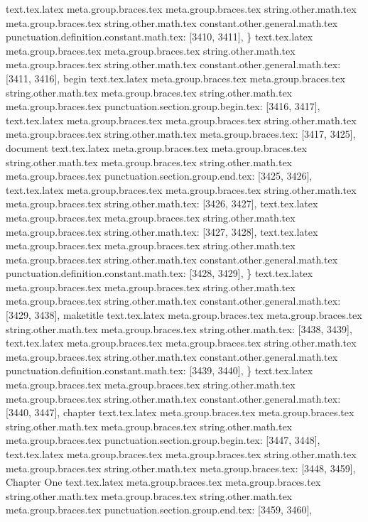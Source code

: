 {{{{{{{{{{{{{{{{{{{{{{{{{{{{{{{{{{{{{{{{{{{{{{{{{{{{{{{{{{{{{{{{{{{{{{{{{{{{{{{{{{{{{{{{{{{{{{{{{{{{{{}
text.tex.latex meta.group.braces.tex meta.group.braces.tex string.other.math.tex meta.group.braces.tex string.other.math.tex constant.other.general.math.tex punctuation.definition.constant.math.tex: [3410, 3411], {\}
text.tex.latex meta.group.braces.tex meta.group.braces.tex string.other.math.tex meta.group.braces.tex string.other.math.tex constant.other.general.math.tex: [3411, 3416], {begin}
text.tex.latex meta.group.braces.tex meta.group.braces.tex string.other.math.tex meta.group.braces.tex string.other.math.tex meta.group.braces.tex punctuation.section.group.begin.tex: [3416, 3417], {{}
text.tex.latex meta.group.braces.tex meta.group.braces.tex string.other.math.tex meta.group.braces.tex string.other.math.tex meta.group.braces.tex: [3417, 3425], {document}
text.tex.latex meta.group.braces.tex meta.group.braces.tex string.other.math.tex meta.group.braces.tex string.other.math.tex meta.group.braces.tex punctuation.section.group.end.tex: [3425, 3426], {}}
text.tex.latex meta.group.braces.tex meta.group.braces.tex string.other.math.tex meta.group.braces.tex string.other.math.tex: [3426, 3427], {
}
text.tex.latex meta.group.braces.tex meta.group.braces.tex string.other.math.tex meta.group.braces.tex string.other.math.tex: [3427, 3428], {
}
text.tex.latex meta.group.braces.tex meta.group.braces.tex string.other.math.tex meta.group.braces.tex string.other.math.tex constant.other.general.math.tex punctuation.definition.constant.math.tex: [3428, 3429], {\}
text.tex.latex meta.group.braces.tex meta.group.braces.tex string.other.math.tex meta.group.braces.tex string.other.math.tex constant.other.general.math.tex: [3429, 3438], {maketitle}
text.tex.latex meta.group.braces.tex meta.group.braces.tex string.other.math.tex meta.group.braces.tex string.other.math.tex: [3438, 3439], {
}
text.tex.latex meta.group.braces.tex meta.group.braces.tex string.other.math.tex meta.group.braces.tex string.other.math.tex constant.other.general.math.tex punctuation.definition.constant.math.tex: [3439, 3440], {\}
text.tex.latex meta.group.braces.tex meta.group.braces.tex string.other.math.tex meta.group.braces.tex string.other.math.tex constant.other.general.math.tex: [3440, 3447], {chapter}
text.tex.latex meta.group.braces.tex meta.group.braces.tex string.other.math.tex meta.group.braces.tex string.other.math.tex meta.group.braces.tex punctuation.section.group.begin.tex: [3447, 3448], {{}
text.tex.latex meta.group.braces.tex meta.group.braces.tex string.other.math.tex meta.group.braces.tex string.other.math.tex meta.group.braces.tex: [3448, 3459], {Chapter One}
text.tex.latex meta.group.braces.tex meta.group.braces.tex string.other.math.tex meta.group.braces.tex string.other.math.tex meta.group.braces.tex punctuation.section.group.end.tex: [3459, 3460], {}}
}}}}}}}}}}}}}}}}}}}}}}}}}}}}}}}}}}}}}}}}}}}}}}}}}}}}}}}}}}}}}}}}}}}}}}}}}}}}}}}}}}}}}}}}}}}}}}}}}}}}}}}}
